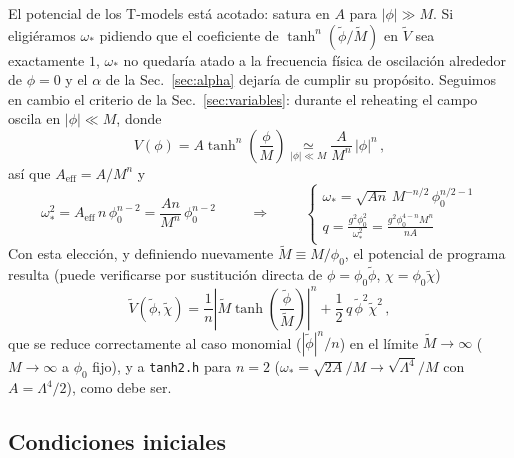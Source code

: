             El potencial de los T-models está acotado: satura en $A$ para $|\phi| \gg M$. Si eligiéramos $\omega_*$ pidiendo que el coeficiente de $\tanh^n(\tilde\phi/\tilde M)$ en $\tilde V$ sea exactamente $1$, $\omega_*$ no quedaría atado a la frecuencia física de oscilación alrededor de $\phi = 0$ y el $\alpha$ de la Sec.~\ref{sec:alpha} dejaría de cumplir su propósito. Seguimos en cambio el criterio de la Sec.~\ref{sec:variables}: durante el reheating el campo oscila en $|\phi| \ll M$, donde
            \begin{equation}
                V(\phi) = A \tanh^n \left( \frac{\phi}{M} \right) \underset{|\phi| \ll M}{\simeq} \frac{A}{M^n} \, |\phi|^n \, ,
            \end{equation}
            así que $A_{\text{eff}} = A/M^n$ y
            \begin{equation}
                \omega_*^2 = A_{\text{eff}} \, n \, \phi_0^{n - 2} = \frac{A n}{M^n} \, \phi_0^{n-2}
                \hspace{1cm} \Longrightarrow \hspace{1cm}
                \begin{cases}
                    \omega_* = \sqrt{A n} \, M^{-n/2} \, \phi_0^{n/2 - 1} \\
                    \displaystyle q = \frac{g^2 \phi_0^2}{\omega_*^2} = \frac{g^2 \phi_0^{4-n} M^n}{n A}
                \end{cases}
            \end{equation}
            Con esta elección, y definiendo nuevamente $\tilde{M} \equiv M/\phi_0$, el potencial de programa resulta (puede verificarse por sustitución directa de $\phi = \phi_0 \tilde\phi$, $\chi = \phi_0\tilde\chi$)
            \begin{equation}
                \tilde{V} \left( \tilde{\phi}, \tilde{\chi} \right) = \frac{1}{n} \left| \tilde{M} \tanh \left( \frac{\tilde{\phi}}{\tilde{M}} \right) \right|^n + \frac{1}{2} \, q \, \tilde{\phi}^2 \tilde{\chi}^2 \, ,
            \end{equation}
            que se reduce correctamente al caso monomial ($|\tilde\phi|^n/n$) en el límite $\tilde M \to \infty$ ($M \to \infty$ a $\phi_0$ fijo), y a \texttt{tanh2.h} para $n=2$ ($\omega_* = \sqrt{2A}/M \to \sqrt{\Lambda^4}/M$ con $A = \Lambda^4/2$), como debe ser.

        \subsection{Condiciones iniciales}

